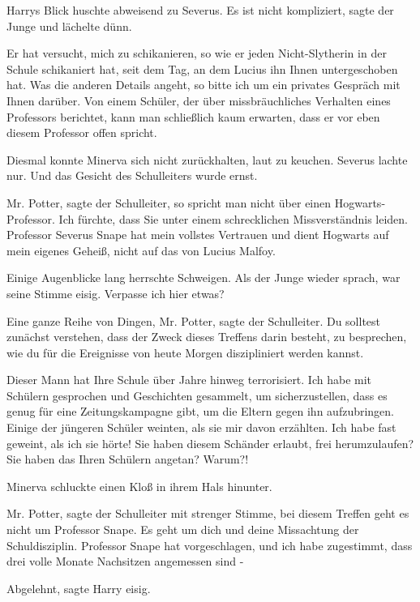 Harrys Blick huschte abweisend zu Severus. \glqq Es ist nicht
kompliziert\grqq{}, sagte der Junge und lächelte dünn.

\glqq Er hat versucht, mich zu schikanieren, so wie er jeden Nicht-Slytherin in
der Schule schikaniert hat, seit dem Tag, an dem Lucius ihn Ihnen untergeschoben
hat. Was die anderen Details angeht, so bitte ich um ein privates Gespräch mit
Ihnen darüber. Von einem Schüler, der über missbräuchliches Verhalten eines
Professors berichtet, kann man schließlich kaum erwarten, dass er vor eben
diesem Professor offen spricht.\grqq{}

Diesmal konnte Minerva sich nicht zurückhalten, laut zu keuchen. Severus lachte
nur. Und das Gesicht des Schulleiters wurde ernst.

\glqq Mr. Potter\grqq{}, sagte der Schulleiter, \glqq so spricht man nicht über
einen Hogwarts-Professor. Ich fürchte, dass Sie unter einem schrecklichen
Missverständnis leiden. Professor Severus Snape hat mein vollstes Vertrauen und
dient Hogwarts auf mein eigenes Geheiß, nicht auf das von Lucius Malfoy.\grqq{}

Einige Augenblicke lang herrschte Schweigen. Als der Junge wieder sprach, war
seine Stimme eisig. \glqq Verpasse ich hier etwas?\grqq{}

\glqq Eine ganze Reihe von Dingen, Mr. Potter\grqq{}, sagte der Schulleiter.
\glqq Du solltest zunächst verstehen, dass der Zweck dieses Treffens darin
besteht, zu besprechen, wie du für die Ereignisse von heute Morgen diszipliniert
werden kannst.\grqq{}

\glqq Dieser Mann hat Ihre Schule über Jahre hinweg terrorisiert. Ich habe mit
Schülern gesprochen und Geschichten gesammelt, um sicherzustellen, dass es genug
für eine Zeitungskampagne gibt, um die Eltern gegen ihn aufzubringen. Einige der
jüngeren Schüler weinten, als sie mir davon erzählten. Ich habe fast geweint,
als ich sie hörte! Sie haben diesem Schänder erlaubt, frei herumzulaufen? Sie
haben das Ihren Schülern angetan? Warum?!\grqq{}

Minerva schluckte einen Kloß in ihrem Hals hinunter.

\glqq Mr. Potter\grqq{}, sagte der Schulleiter mit strenger Stimme, \glqq bei
diesem Treffen geht es nicht um Professor Snape. Es geht um dich und deine
Missachtung der Schuldisziplin. Professor Snape hat vorgeschlagen, und ich habe
zugestimmt, dass drei volle Monate Nachsitzen angemessen sind -\grqq{}

\glqq Abgelehnt\grqq{}, sagte Harry eisig.


